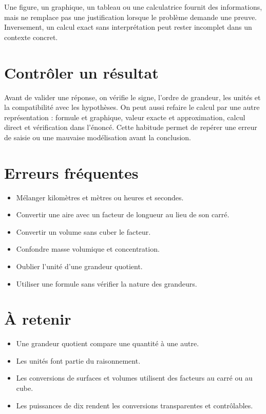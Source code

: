 \begin{attention}
Une figure, un graphique, un tableau ou une calculatrice fournit des informations, mais ne remplace pas une justification lorsque le problème demande une preuve. Inversement, un calcul exact sans interprétation peut rester incomplet dans un contexte concret.
\end{attention}

\section{Contrôler un résultat}
Avant de valider une réponse, on vérifie le signe, l’ordre de grandeur, les unités et la compatibilité avec les hypothèses. On peut aussi refaire le calcul par une autre représentation : formule et graphique, valeur exacte et approximation, calcul direct et vérification dans l’énoncé. Cette habitude permet de repérer une erreur de saisie ou une mauvaise modélisation avant la conclusion.

\section{Erreurs fréquentes}
\begin{itemize}
\item Mélanger kilomètres et mètres ou heures et secondes.
\item Convertir une aire avec un facteur de longueur au lieu de son carré.
\item Convertir un volume sans cuber le facteur.
\item Confondre masse volumique et concentration.
\item Oublier l’unité d’une grandeur quotient.
\item Utiliser une formule sans vérifier la nature des grandeurs.
\end{itemize}

\section{À retenir}
\begin{aretenir}
\begin{itemize}
\item Une grandeur quotient compare une quantité à une autre.
\item Les unités font partie du raisonnement.
\item Les conversions de surfaces et volumes utilisent des facteurs au carré ou au cube.
\item Les puissances de dix rendent les conversions transparentes et contrôlables.
\end{itemize}
\end{aretenir}

